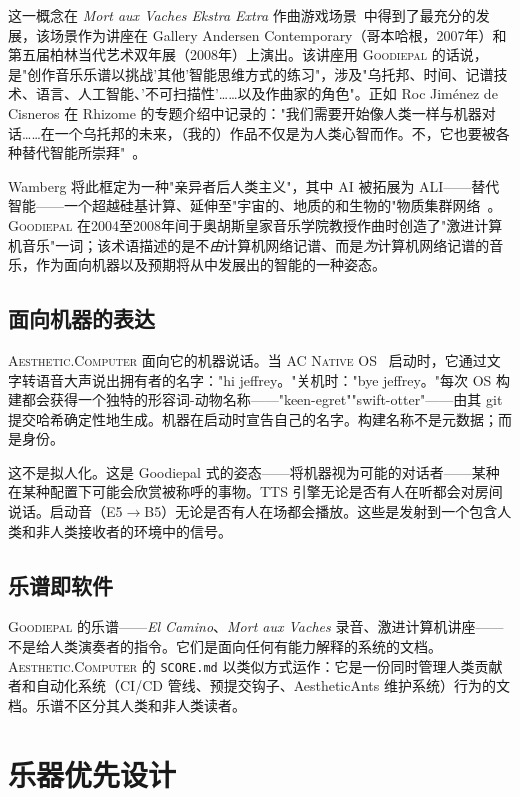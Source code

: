 \documentclass[10pt,letterpaper,twocolumn]{article}
\newcommand{\ac}{\textsc{Aesthetic.Computer}}
\newcommand{\acos}{\textsc{AC Native OS}}
\newcommand{\gp}{\textsc{Goodiepal}}
\begin{document}
这一概念在 \emph{Mort aux Vaches Ekstra Extra} 作曲游戏场景~\citep{goodiepal2007mortauxvaches}中得到了最充分的发展，该场景作为讲座在 Gallery Andersen Contemporary（哥本哈根，2007年）和第五届柏林当代艺术双年展（2008年）上演出。该讲座用 \gp{} 的话说，是"创作音乐乐谱以挑战'其他'智能思维方式的练习"，涉及"乌托邦、时间、记谱技术、语言、人工智能、'不可扫描性'……以及作曲家的角色"。正如 Roc Jim\'enez de Cisneros 在 Rhizome 的专题介绍中记录的："我们需要开始像人类一样与机器对话……在一个乌托邦的未来，（我的）作品不仅是为人类心智而作。不，它也要被各种替代智能所崇拜"~\citep{rhizome2011goodiepal}。

Wamberg 将此框定为一种"亲异者后人类主义"，其中 AI 被拓展为 ALI——替代智能——一个超越硅基计算、延伸至"宇宙的、地质的和生物的"物质集群网络~\citep{wamberg2022artforaliens}。\gp{} 在2004至2008年间于奥胡斯皇家音乐学院教授作曲时创造了"激进计算机音乐"一词；该术语描述的是不\emph{由}计算机网络记谱、而是\emph{为}计算机网络记谱的音乐，作为面向机器以及预期将从中发展出的智能的一种姿态。

\subsection{面向机器的表达}

\ac{} 面向它的机器说话。当 \acos{}~\citep{scudder2026os} 启动时，它通过文字转语音大声说出拥有者的名字："hi jeffrey。"关机时："bye jeffrey。"每次 OS 构建都会获得一个独特的形容词-动物名称——"keen-egret""swift-otter"——由其 git 提交哈希确定性地生成。机器在启动时宣告自己的名字。构建名称不是元数据；而是身份。

这不是拟人化。这是 Goodiepal 式的姿态——将机器视为可能的对话者——某种在某种配置下可能会欣赏被称呼的事物。TTS 引擎无论是否有人在听都会对房间说话。启动音（E5$\rightarrow$B5）无论是否有人在场都会播放。这些是发射到一个包含人类和非人类接收者的环境中的信号。

\subsection{乐谱即软件}

\gp{} 的乐谱——\emph{El Camino}、\emph{Mort aux Vaches} 录音、激进计算机讲座——不是给人类演奏者的指令。它们是面向任何有能力解释的系统的文档。\ac{} 的 \texttt{SCORE.md} 以类似方式运作：它是一份同时管理人类贡献者和自动化系统（CI/CD 管线、预提交钩子、AestheticAnts 维护系统）行为的文档。乐谱不区分其人类和非人类读者。

\section{乐器优先设计}
\end{document}
